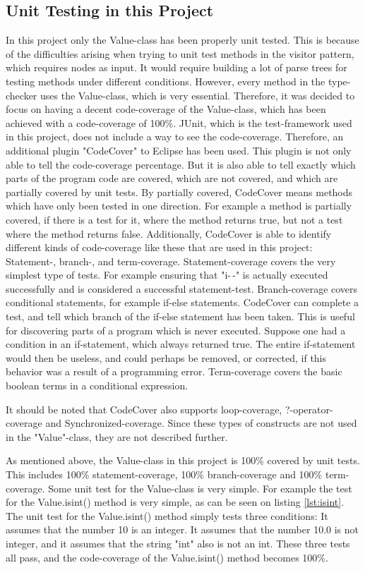 \subsection{Unit Testing in this Project}
In this project only the Value-class has been properly unit tested. This is because of the difficulties arising when trying to unit test methods in the visitor pattern, which requires nodes as input. It would require building a lot of parse trees for testing methods under different conditions. However, every method in the type-checker uses the Value-class, which is very essential. Therefore, it was decided to focus on having a decent code-coverage of the Value-class, which has been achieved with a code-coverage of 100\%. JUnit, which is the test-framework used in this project, does not include a way to see the code-coverage. Therefore, an additional plugin "CodeCover" \citep{codecover} to Eclipse has been used. This plugin is not only able to tell the code-coverage percentage. But it is also able to tell exactly which parts of the program code are covered, which are not covered, and which are partially covered by unit tests. By partially covered, CodeCover means methods which have only been tested in one direction. For example a method is partially covered, if there is a test for it, where the method returns true, but not a test where the method returns false. Additionally, CodeCover is able to identify different kinds of code-coverage like these that are used in this project: Statement-, branch-, and term-coverage. Statement-coverage covers the very simplest type of tests. For example ensuring that "i-$\,$-" is actually executed successfully and is considered a successful statement-test.
Branch-coverage covers conditional statements, for example if-else statements. CodeCover can complete a test, and tell which branch of the if-else statement has been taken. This is useful for discovering parts of a program which is never executed. Suppose one had a condition in an if-statement, which always returned true. The entire if-statement would then be useless, and could perhaps be removed, or corrected, if this behavior was a result of a programming error. Term-coverage covers the basic boolean terms in a conditional expression. 

It should be noted that CodeCover also supports loop-coverage, ?-operator-coverage and Synchronized-coverage. Since these types of constructs are not used in the "Value"-class, they are not described further. 

As mentioned above, the Value-class in this project is 100\% covered by unit tests. This includes 100\% statement-coverage, 100\% branch-coverage and 100\% term-coverage. Some unit test for the Value-class is very simple. For example the test for the Value.isint() method is very simple, as can be seen on listing \ref{lst:isint}. The unit test for the Value.isint() method simply tests three conditions: It assumes that the number 10 is an integer. It assumes that the number 10.0 is not integer, and it assumes that the string "int" also is not an int. These three tests all pass, and the code-coverage of the Value.isint() method becomes 100\%. 

